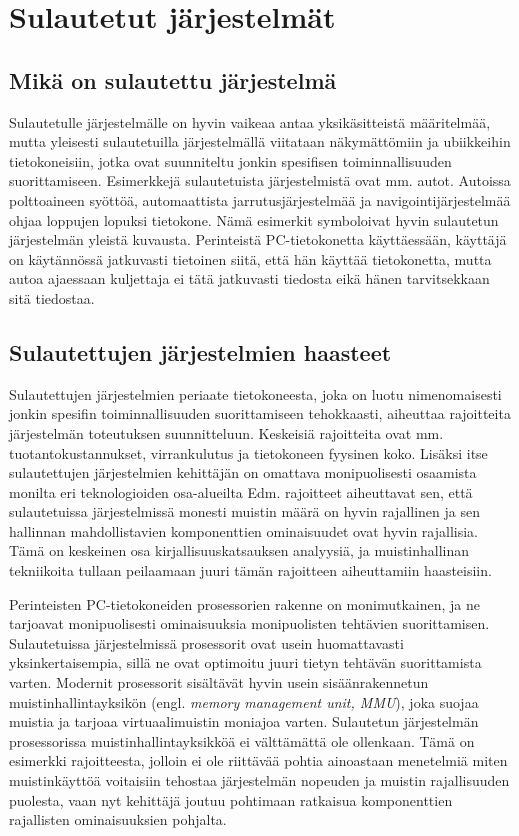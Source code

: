 \chapter{Sulautetut järjestelmät} \label{Kolmas luku}

\section{Mikä on sulautettu järjestelmä}

Sulautetulle järjestelmälle on hyvin vaikeaa antaa yksikäsitteistä määritelmää, mutta yleisesti sulautetuilla järjestelmällä viitataan näkymättömiin ja ubiikkeihin tietokoneisiin, jotka ovat suunniteltu jonkin spesifisen toiminnallisuuden suorittamiseen. Esimerkkejä sulautetuista järjestelmistä ovat mm. autot. Autoissa polttoaineen syöttöä, automaattista jarrutusjärjestelmää ja navigointijärjestelmää ohjaa loppujen lopuksi tietokone.\cite{rtcfes2015book} Nämä esimerkit symboloivat hyvin sulautetun järjestelmän yleistä kuvausta. Perinteistä PC-tietokonetta käyttäessään, käyttäjä on käytännössä jatkuvasti tietoinen siitä, että hän käyttää tietokonetta, mutta autoa ajaessaan kuljettaja ei tätä jatkuvasti tiedosta eikä hänen tarvitsekkaan sitä tiedostaa.

\section{Sulautettujen järjestelmien haasteet} 

Sulautettujen järjestelmien periaate tietokoneesta, joka on luotu nimenomaisesti jonkin spesifin toiminnallisuuden suorittamiseen tehokkaasti, aiheuttaa rajoitteita järjestelmän toteutuksen suunnitteluun. Keskeisiä rajoitteita ovat mm. tuotantokustannukset, virrankulutus ja tietokoneen fyysinen koko. Lisäksi itse sulautettujen järjestelmien kehittäjän on omattava monipuolisesti osaamista monilta eri teknologioiden osa-alueilta\cite{rtcfes2015book} Edm. rajoitteet aiheuttavat sen, että sulautetuissa järjestelmissä monesti muistin määrä on hyvin rajallinen ja sen hallinnan mahdollistavien komponenttien ominaisuudet ovat hyvin rajallisia. Tämä on keskeinen osa kirjallisuuskatsauksen analyysiä, ja muistinhallinan tekniikoita tullaan peilaamaan juuri tämän rajoitteen aiheuttamiin haasteisiin.

Perinteisten PC-tietokoneiden prosessorien rakenne on monimutkainen, ja ne tarjoavat monipuolisesti ominaisuuksia monipuolisten tehtävien suorittamisen. Sulautetuissa järjestelmissä prosessorit ovat usein huomattavasti yksinkertaisempia, sillä ne ovat optimoitu juuri tietyn tehtävän suorittamista varten. Modernit prosessorit sisältävät hyvin usein sisäänrakennetun muistinhallintayksikön (engl. \textit{memory management unit, MMU}), joka suojaa muistia ja tarjoaa virtuaalimuistin moniajoa varten. Sulautetun järjestelmän prosessorissa muistinhallintayksikköä ei välttämättä ole ollenkaan.\cite{rtcfes2015book} Tämä on esimerkki rajoitteesta, jolloin ei ole riittävää pohtia ainoastaan menetelmiä miten muistinkäyttöä voitaisiin tehostaa järjestelmän nopeuden ja muistin rajallisuuden puolesta, vaan nyt kehittäjä joutuu pohtimaan ratkaisua komponenttien rajallisten ominaisuuksien pohjalta.